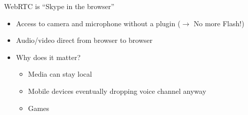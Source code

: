 \begin{frame}{WebRTC is ``Skype in the browser''}
\begin{itemize}
\item Access to camera and microphone without a plugin ($\rightarrow$ No more Flash!)
\item Audio/video direct from browser to browser
\item Why does it matter?
\begin{itemize}
\item Media can stay local
\item Mobile devices eventually dropping voice channel anyway
\item Games
\end{itemize}
\end{itemize}
\end{frame}